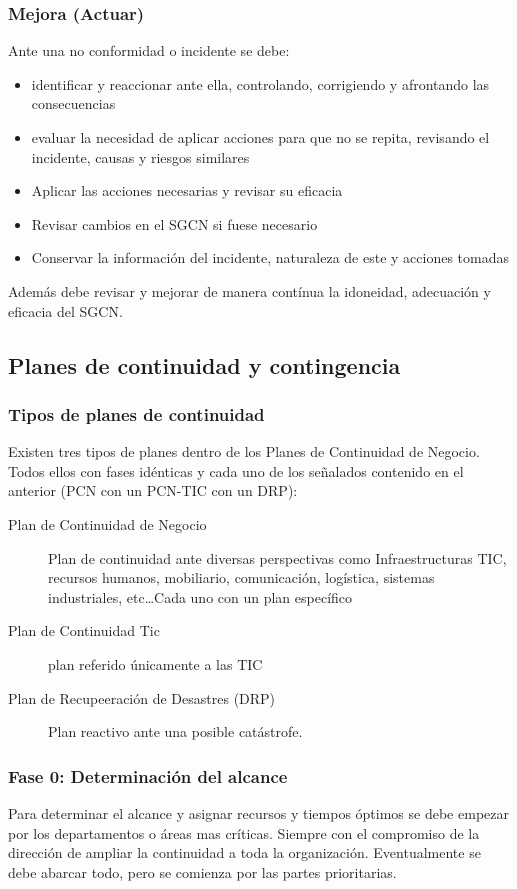     \subsubsection{Mejora (Actuar)} %
        Ante una no conformidad o incidente se debe:
        \begin{itemize}
            \item identificar y reaccionar ante ella, controlando, corrigiendo y afrontando las consecuencias
            \item evaluar la necesidad de aplicar acciones para que no se repita, revisando el incidente, causas y riesgos similares
            \item Aplicar las acciones necesarias y revisar su eficacia
            \item Revisar cambios en el SGCN si fuese necesario
            \item Conservar la información del incidente, naturaleza de este y acciones tomadas
        \end{itemize}

        Además debe revisar y mejorar de manera contínua la idoneidad, adecuación y eficacia del SGCN.

\subsection{Planes de continuidad y contingencia} %
    \subsubsection{Tipos de planes de continuidad} %
        Existen tres tipos de planes dentro de los Planes de Continuidad de Negocio. Todos ellos con fases idénticas y cada uno de los señalados contenido en el anterior (PCN con un PCN-TIC con un DRP):
        \begin{description}
            \item[Plan de Continuidad de Negocio] Plan de continuidad ante diversas perspectivas como Infraestructuras TIC, recursos humanos, mobiliario, comunicación, logística, sistemas industriales, etc\dots Cada uno con un plan específico
            \item[Plan de Continuidad Tic] plan referido únicamente a las TIC
            \item[Plan de Recupeeración de Desastres (DRP)] Plan reactivo ante una posible catástrofe.
        \end{description}

    \subsubsection{Fase 0: Determinación del alcance} %
        Para determinar el alcance y asignar recursos y tiempos óptimos se debe empezar por los departamentos o áreas mas críticas. Siempre con el compromiso de la dirección de ampliar la continuidad a toda la organización. Eventualmente se debe abarcar todo, pero se comienza por las partes prioritarias.

